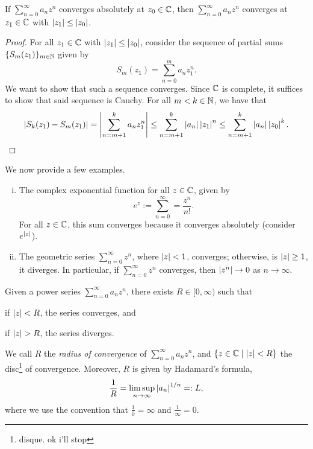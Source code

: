 \newpage
\begin{proposition}
    If $\sum_{n=0}^\infty a_nz^n$ converges absolutely at $z_0 \in \mathbb C$, then $\sum_{n=0}^\infty a_nz^n$ converges at $z_1 \in \mathbb C$ with $\left\lvert z_1 \right\rvert \leq \left\lvert z_0 \right\rvert$.
\end{proposition}
\begin{proof}
    For all $z_1 \in \mathbb C$ with $\left\lvert z_1 \right\rvert \leq \left\lvert z_0 \right\rvert$, consider the sequence of partial sums $\{S_m(z_1)\}_{m \in \mathbb N}$ given by
    \[ S_m(z_1) = \sum_{n=0}^m a_n z_1^n. \]
    We want to show that such a sequence converges. Since $\mathbb C$ is complete, it suffices to show that said sequence is Cauchy. For all $m < k \in \mathbb N$, we have that
    \[ \left\lvert S_k(z_1) - S_m(z_1) \right\rvert = \left\lvert \sum_{n=m+1}^k a_n z_1^n \right\rvert \leq \sum_{n=m+1}^k \left\lvert a_n \right\rvert \left\lvert z_1 \right\rvert^n \leq \sum_{n=m+1}^k \left\lvert a_n \right\rvert \left\lvert z_0 \right\rvert^k. \]
\end{proof}
\noindent We now provide a few examples.
\begin{enumerate}[(i)]
    \item The complex exponential function for all $z \in \mathbb C$, given by
    \[ e^z := \sum_{n=0}^\infty = \frac{z^n}{n!}. \]
    For all $z \in \mathbb C$, this sum converges because it converges absolutely (consider $e^{\left\lvert z \right\rvert}$).
    \item The geometric series $\sum_{n=0}^\infty z^n$, where $\left\lvert z \right\rvert < 1$, converges; otherwise, is $\left\lvert z \right\rvert \geq 1$, it diverges. In particular, if $\sum_{n=0}^\infty z^n$ converges, then $\left\lvert z^n \right\rvert \to 0$ as $n \to \infty$.
\end{enumerate}
\begin{theorem}
    Given a power series $\sum_{n=0}^\infty a_n z^n$, there exists $R \in [0, \infty)$ such that \begin{parlist}
        \item if $\left\lvert z \right\rvert < R$, the series converges, and
        \item if $\left\lvert z \right\rvert > R$, the series diverges.
    \end{parlist} We call $R$ the \textit{radius of convergence} of $\sum_{n=0}^\infty a_n z^n$, and $\{z \in \mathbb C \mid \left\lvert z \right\rvert < R\}$ the disc\footnote{disque. ok i'll stop} of convergence. Moreover, $R$ is given by Hadamard's formula,
    \[ \frac{1}{R} = \limsup_{n \to \infty} \left\lvert a_n \right\rvert^{1/n} =: L, \]
    where we use the convention that $\frac{1}{0} = \infty$ and $\frac{1}{\infty} = 0$.
\end{theorem}
